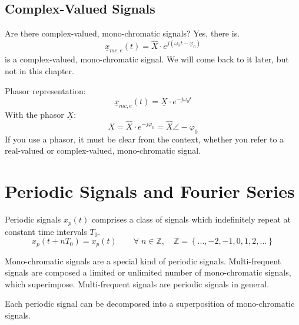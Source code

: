 \begin{refsection}
\subsection{Complex-Valued Signals}

\begin{excursus}{Are there complex-valued, mono-chromatic signals?}
	Yes, there is.
	\begin{equation}
		\underline{x}_{mc,e}(t) = \hat{X} \cdot e^{j \left(\omega_0 t - \varphi_0\right)}
	\end{equation}
	is a complex-valued, mono-chromatic signal. We will come back to it later, but not in this chapter.
	
	\vspace{0.5em}
	Phasor representation:
	\begin{equation}
		\underline{x}_{mc,e}(t) = \underline{X} \cdot e^{- j \omega_0 t}
	\end{equation}
	With the phasor $\underline{X}$:
	\begin{equation}
		\underline{X} = \hat{X} \cdot e^{- j \varphi_0} =  \hat{X} \angle -\varphi_0
	\end{equation}
	If you use a phasor, it must be clear from the context, whether you refer to a real-valued or complex-valued, mono-chromatic signal.
\end{excursus}

\section{Periodic Signals and Fourier Series}

Periodic signals $x_p(t)$ comprises a class of signals which indefinitely repeat at constant time intervals $T_0$.
\begin{equation}
	x_p(t + n T_0) = x_p(t) \qquad \forall \; n \in \mathbb{Z}, \quad \mathbb{Z} = \left\{..., -2, -1, 0, 1, 2, ...\right\}
\end{equation}%
%

Mono-chromatic signals are a special kind of periodic signals. Multi-frequent signals are composed a limited or unlimited number of mono-chromatic signals, which superimpose. Multi-frequent signals are periodic signals in general.

\begin{fact}
	Each periodic signal can be decomposed into a superposition of mono-chromatic signals.
\end{fact}


\end{refsection}

